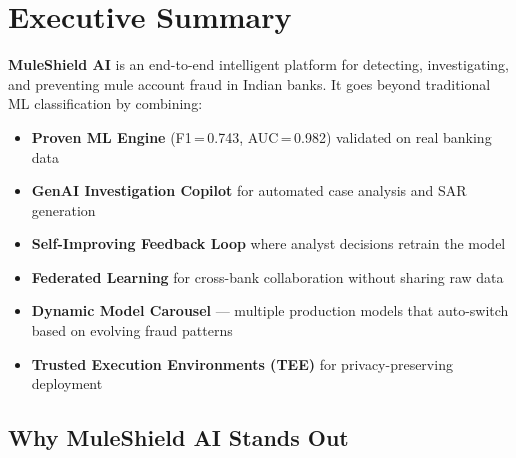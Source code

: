 \documentclass[11pt, a4paper]{article}
\newcommand{\muleshield}{\textbf{\textcolor{mainblue}{MuleShield AI}}}
\begin{document}
\vfill

\noindent{\color{boiorange}\rule{\textwidth}{3pt}}

\restoregeometry
\clearpage

\thispagestyle{empty}
\tableofcontents
\clearpage
\setcounter{page}{1}


\section{Executive Summary}

\muleshield{} is an end-to-end intelligent platform for detecting, investigating, and preventing mule account fraud in Indian banks. It goes beyond traditional ML classification by combining:

\begin{itemize}
    \item \textbf{Proven ML Engine} (F1\,=\,0.743, AUC\,=\,0.982) validated on real banking data
    \item \textbf{GenAI Investigation Copilot} for automated case analysis and SAR generation
    \item \textbf{Self-Improving Feedback Loop} where analyst decisions retrain the model
    \item \textbf{Federated Learning} for cross-bank collaboration without sharing raw data
    \item \textbf{Dynamic Model Carousel} --- multiple production models that auto-switch based on evolving fraud patterns
    \item \textbf{Trusted Execution Environments (TEE)} for privacy-preserving deployment
\end{itemize}

\subsection{Why MuleShield AI Stands Out}
\end{document}
